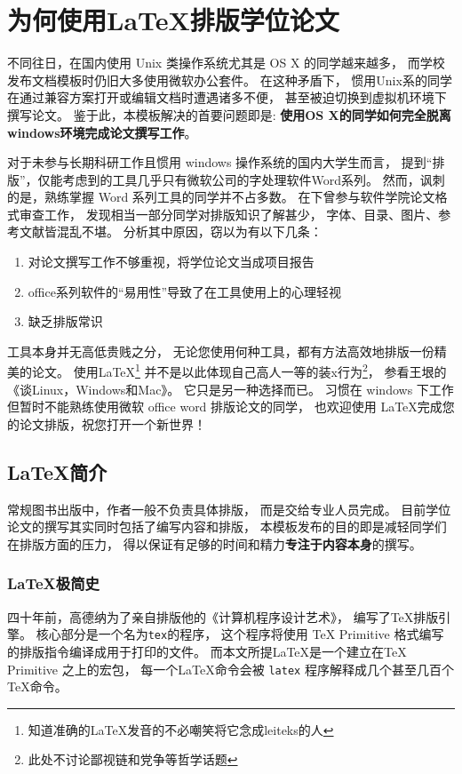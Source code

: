 \chapter{为何使用\LaTeX 排版学位论文}
不同往日，在国内使用 Unix 类操作系统尤其是 OS X 的同学越来越多，
而学校发布文档模板时仍旧大多使用微软办公套件。
在这种矛盾下，
惯用Unix系的同学在通过兼容方案打开或编辑文档时遭遇诸多不便，
甚至被迫切换到虚拟机环境下撰写论文。
鉴于此，本模板解决的首要问题即是:
\textbf{使用OS X的同学如何完全脱离windows环境完成论文撰写工作}。

对于未参与长期科研工作且惯用 windows 操作系统的国内大学生而言，
提到“排版”，仅能考虑到的工具几乎只有微软公司的字处理软件Word系列。
然而，讽刺的是，熟练掌握 Word 系列工具的同学并不占多数。
在下曾参与软件学院论文格式审查工作，
发现相当一部分同学对排版知识了解甚少，
字体、目录、图片、参考文献皆混乱不堪。
分析其中原因，窃以为有以下几条：
\begin{enumerate}
    \item 对论文撰写工作不够重视，将学位论文当成项目报告
    \item office系列软件的“易用性”导致了在工具使用上的心理轻视
    \item 缺乏排版常识
\end{enumerate}

工具本身并无高低贵贱之分，
无论您使用何种工具，都有方法高效地排版一份精美的论文。
使用\LaTeX \footnote{知道准确的\LaTeX 发音的不必嘲笑将它念成leiteks的人}
并不是以此体现自己高人一等的装x行为\footnote{此处不讨论鄙视链和党争等哲学话题}，
参看王垠的《谈Linux，Windows和Mac》\cite{yinwang2013}。
它只是另一种选择而已。
习惯在 windows 下工作但暂时不能熟练使用微软 office word 排版论文的同学，
也欢迎使用 \LaTeX 完成您的论文排版，祝您打开一个新世界！

\section{\LaTeX  简介}
常规图书出版中，作者一般不负责具体排版，
而是交给专业人员完成。
目前学位论文的撰写其实同时包括了编写内容和排版，
本模板发布的目的即是减轻同学们在排版方面的压力，
得以保证有足够的时间和精力\textbf{专注于内容本身}的撰写。

\subsection{\LaTeX 极简史}
四十年前，高德纳为了亲自排版他的《计算机程序设计艺术》，
编写了\TeX 排版引擎。
核心部分是一个名为\texttt{tex}的程序，
这个程序将使用 TeX Primitive 格式编写的排版指令编译成用于打印的文件。
而本文所提\LaTeX 是一个建立在TeX Primitive 之上的宏包，
每一个\LaTeX 命令会被 \texttt{latex} 程序解释成几个甚至几百个\TeX 命令。

